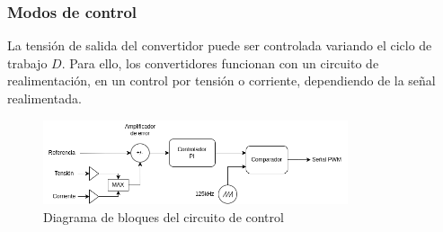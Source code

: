 
\subsubsection{Modos de control}

La tensión de salida del convertidor puede ser controlada variando el ciclo de trabajo $D$. 
Para ello, los convertidores funcionan con un circuito de realimentación,
en un control por tensión o corriente, dependiendo de la señal realimentada. 

\begin{figure}[ht]
    \centering
    \includegraphics[width=0.8\textwidth]{images/compensador.png}
    \caption{Diagrama de bloques del circuito de control}
    \label{fig:marco_teorico:control}
\end{figure}

